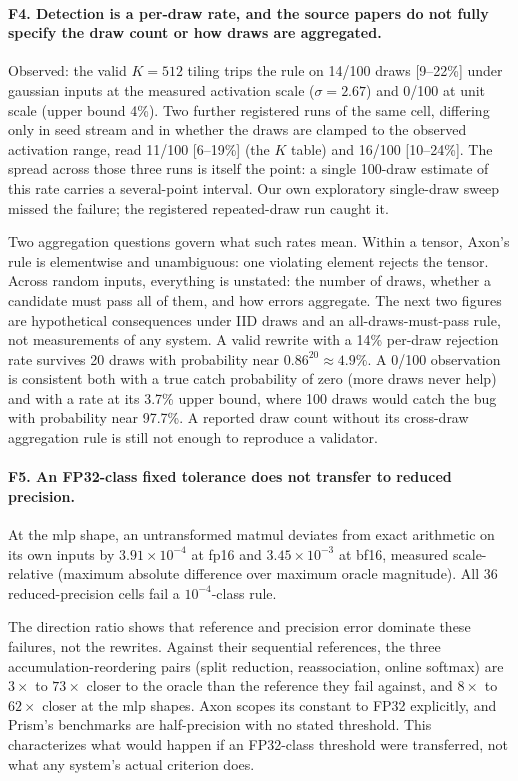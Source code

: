 \documentclass[twocolumn,10pt]{article}
\newcommand{\e}[2]{$#1\times10^{#2}$}
\begin{document}
\paragraph{F4. Detection is a per-draw rate, and the source papers do
not fully specify the draw count or how draws are aggregated.} Observed:
the valid $K{=}512$ tiling trips the rule on 14/100 draws [9--22\%]
under gaussian inputs at the measured activation scale ($\sigma=2.67$)
and 0/100 at unit scale (upper bound 4\%). Two further registered runs
of the same cell, differing only in seed stream and in whether the draws
are clamped to the observed activation range, read 11/100 [6--19\%] (the
$K$ table) and 16/100 [10--24\%]. The spread across those three runs is
itself the point: a single 100-draw estimate of this rate carries a
several-point interval. Our own exploratory single-draw sweep missed the
failure; the registered repeated-draw run caught it.

Two aggregation questions govern what such rates mean. Within a tensor,
Axon's rule is elementwise and unambiguous: one violating element
rejects the tensor. Across random inputs, everything is unstated: the
number of draws, whether a candidate must pass all of them, and how
errors aggregate. The next two figures are hypothetical consequences
under IID draws and an all-draws-must-pass rule, not measurements of any
system. A valid rewrite with a 14\% per-draw rejection rate survives 20
draws with probability near $0.86^{20}\approx4.9\%$. A 0/100 observation
is consistent both with a true catch probability of zero (more draws
never help) and with a rate at its 3.7\% upper bound, where 100 draws
would catch the bug with probability near 97.7\%. A reported draw count
without its cross-draw aggregation rule is still not enough to reproduce
a validator.

\paragraph{F5. An FP32-class fixed tolerance does not transfer to
reduced precision.} At the mlp shape, an untransformed matmul deviates
from exact arithmetic on its own inputs by \e{3.91}{-4} at fp16 and
\e{3.45}{-3} at bf16, measured scale-relative (maximum absolute
difference over maximum oracle magnitude). All 36 reduced-precision
cells fail a $10^{-4}$-class rule.

The direction ratio shows that reference and precision error dominate
these failures, not the rewrites. Against their sequential references,
the three accumulation-reordering pairs (split reduction, reassociation,
online softmax) are $3\times$ to $73\times$ closer to the oracle than
the reference they fail against, and $8\times$ to $62\times$ closer at
the mlp shapes. Axon scopes its constant to FP32 explicitly, and Prism's
benchmarks are half-precision with no stated threshold. This
characterizes what would happen if an FP32-class threshold were
transferred, not what any system's actual criterion does.
\end{document}
